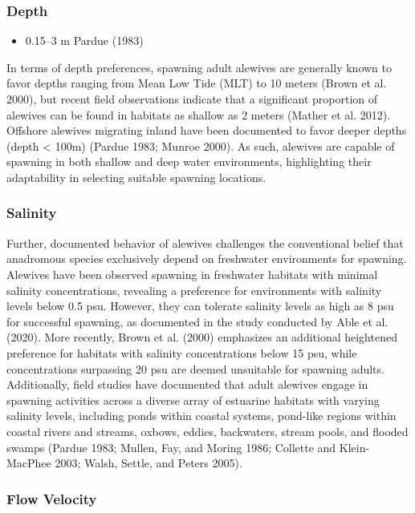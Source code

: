 \documentclass[
]{book}
\providecommand{\tightlist}{%
  \setlength{\itemsep}{0pt}\setlength{\parskip}{0pt}}
\begin{document}
\hypertarget{depth}{%
\subsubsection{Depth}\label{depth}}

\begin{itemize}
\tightlist
\item
  0.15--3 m Pardue (1983)
\end{itemize}

In terms of depth preferences, spawning adult alewives are generally known to favor depths ranging from Mean Low Tide (MLT) to 10 meters (Brown et al. 2000), but recent field observations indicate that a significant proportion of alewives can be found in habitats as shallow as 2 meters (Mather et al. 2012).
Offshore alewives migrating inland have been documented to favor deeper depths (depth \textless{} 100m) (Pardue 1983; Munroe 2000).
As such, alewives are capable of spawning in both shallow and deep water environments, highlighting their adaptability in selecting suitable spawning locations.

\hypertarget{salinity}{%
\subsubsection{Salinity}\label{salinity}}

Further, documented behavior of alewives challenges the conventional belief that anadromous species exclusively depend on freshwater environments for spawning.
Alewives have been observed spawning in freshwater habitats with minimal salinity concentrations, revealing a preference for environments with salinity levels below 0.5 psu.
However, they can tolerate salinity levels as high as 8 psu for successful spawning, as documented in the study conducted by Able et al. (2020). More recently, Brown et al. (2000) emphasizes an additional heightened preference for habitats with salinity concentrations below 15 psu, while concentrations surpassing 20 psu are deemed unsuitable for spawning adults.
Additionally, field studies have documented that adult alewives engage in spawning activities across a diverse array of estuarine habitats with varying salinity levels, including ponds within coastal systems, pond-like regions within coastal rivers and streams, oxbows, eddies, backwaters, stream pools, and flooded swamps (Pardue 1983; Mullen, Fay, and Moring 1986; Collette and Klein-MacPhee 2003; Walsh, Settle, and Peters 2005).

\hypertarget{flow-velocity}{%
\subsubsection{Flow Velocity}\label{flow-velocity}}
\end{document}
